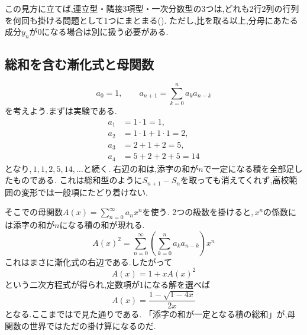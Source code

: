 この見方に立てば,連立型・隣接3項型・一次分数型の3つは,どれも2行2列の行列を何回も掛ける問題として1つにまとまる().
ただし,比を取る以上,分母にあたる成分$y_n$が0になる場合は別に扱う必要がある.

\subsection{総和を含む漸化式と母関数}\label{節：総和を含む漸化式と母関数}

\[
  a_0=1,\qquad a_{n+1}=\sum_{k=0}^{n}a_ka_{n-k}
\]
を考えよう.まずは実験である.
\begin{align*}
  a_1&=1\cdot1=1,\\
  a_2&=1\cdot1+1\cdot1=2,\\
  a_3&=2+1+2=5,\\
  a_4&=5+2+2+5=14
\end{align*}
となり,\,$1,1,2,5,14,\ldots$と続く.
右辺の和は,添字の和が$n$で一定になる積を全部足したものである.
これは総和型のように$S_{n+1}-S_n$を取っても消えてくれず,高校範囲の変形では一般項にたどり着けない.

そこでの母関数$A(x)=\sum_{n=0}^{\infty}a_nx^n$を使う.
2つの級数を掛けると,\,$x^n$の係数には添字の和が$n$になる積の和が現れる.
\[
  A(x)^2=\sum_{n=0}^{\infty}\left(\sum_{k=0}^{n}a_ka_{n-k}\right)x^n
\]
これはまさに漸化式の右辺である.したがって
\[
  A(x)=1+xA(x)^2
\]
という二次方程式が得られ,定数項が1になる解を選べば
\[
  A(x)=\frac{1-\sqrt{1-4x}}{2x}
\]
となる.ここまではで見た通りである.
「添字の和が一定となる積の総和」が,母関数の世界ではただの掛け算になるのだ.

